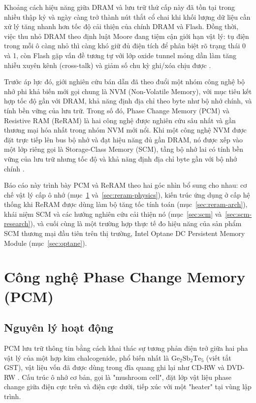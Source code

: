 \documentclass[12pt,a4paper]{article}
\begin{document}
Khoảng cách hiệu năng giữa DRAM và lưu trữ thứ cấp này đã tồn tại trong nhiều thập kỷ và ngày càng trở thành nút thắt cổ chai khi khối lượng dữ liệu cần xử lý tăng nhanh hơn tốc độ cải thiện của chính DRAM và Flash. Đồng thời, việc thu nhỏ DRAM theo định luật Moore đang tiệm cận giới hạn vật lý: tụ điện trong mỗi ô càng nhỏ thì càng khó giữ đủ điện tích để phân biệt rõ trạng thái 0 và 1, còn Flash gặp vấn đề tương tự với lớp oxide tunnel mỏng dần làm tăng nhiễu xuyên kênh (cross-talk) và giảm số chu kỳ ghi/xóa chịu được \cite{meena2014}.

Trước áp lực đó, giới nghiên cứu bán dẫn đã theo đuổi một nhóm công nghệ bộ nhớ phi khả biến mới gọi chung là NVM (Non-Volatile Memory), với mục tiêu kết hợp tốc độ gần với DRAM, khả năng định địa chỉ theo byte như bộ nhớ chính, và tính bền vững của lưu trữ. Trong số đó, Phase Change Memory (PCM) và Resistive RAM (ReRAM) là hai công nghệ được nghiên cứu sâu nhất và gần thương mại hóa nhất trong nhóm NVM mới nổi. Khi một công nghệ NVM được đặt trực tiếp lên bus bộ nhớ và đạt hiệu năng đủ gần DRAM, nó được xếp vào một lớp riêng gọi là Storage-Class Memory (SCM), tầng bộ nhớ lai có tính bền vững của lưu trữ nhưng tốc độ và khả năng định địa chỉ byte gần với bộ nhớ chính \cite{kamath2019}.

Báo cáo này trình bày PCM và ReRAM theo hai góc nhìn bổ sung cho nhau: cơ chế vật lý cấp ô nhớ (mục~\ref{sec:pcm} và~\ref{sec:reram-physics}), kiến trúc ứng dụng ở cấp hệ thống khi ReRAM được dùng làm bộ tăng tốc tính toán (mục~\ref{sec:reram-arch}), khái niệm SCM và các hướng nghiên cứu cải thiện nó (mục~\ref{sec:scm} và~\ref{sec:scm-research}), và cuối cùng là một trường hợp thực tế đo hiệu năng của sản phẩm SCM thương mại đầu tiên trên thị trường, Intel Optane DC Persistent Memory Module (mục~\ref{sec:optane}).

\section{Công nghệ Phase Change Memory (PCM)}
\label{sec:pcm}

\subsection{Nguyên lý hoạt động}

PCM lưu trữ thông tin bằng cách khai thác sự tương phản điện trở giữa hai pha vật lý của một hợp kim chalcogenide, phổ biến nhất là $\mathrm{Ge_2Sb_2Te_5}$ (viết tắt GST), vật liệu vốn đã được dùng trong đĩa quang ghi lại như CD-RW và DVD-RW \cite{wong2010}. Cấu trúc ô nhớ cơ bản, gọi là "mushroom cell", đặt lớp vật liệu phase change giữa điện cực trên và điện cực dưới, tiếp xúc với một "heater" tại vùng lập trình.
\end{document}
